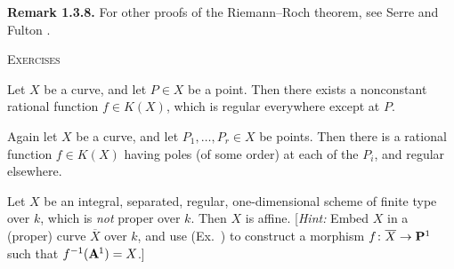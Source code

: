 {\medskip
\noindent\hypertarget{result-IV-1.3.8}{}\textbf{Remark 1.3.8.} For other proofs of the Riemann--Roch theorem, see Serre  and Fulton .

\medskip
\noindent\textsc{Exercises}\par\nobreak\smallskip
{\fontsize{9.2}{10.55}\selectfont\leftskip=21pt\relax
\noindent\hypertarget{ex-IV-1.1}{}Let $X$ be a curve, and let $P\in X$ be a point. Then there exists a nonconstant rational function $f\in K(X)$, which is regular everywhere except at $P$.

\smallskip
\noindent\hypertarget{ex-IV-1.2}{}Again let $X$ be a curve, and let $P_1,\ldots,P_r\in X$ be points. Then there is a rational function $f\in K(X)$ having poles (of some order) at each of the $P_i$, and regular elsewhere.

\smallskip
\noindent\hypertarget{ex-IV-1.3}{}Let $X$ be an integral, separated, regular, one-dimensional scheme of finite type over $k$, which is \emph{not} proper over $k$. Then $X$ is affine. [\emph{Hint:} Embed $X$ in a (proper) curve $\overline X$ over $k$, and use (Ex.~) to construct a morphism $f\colon\overline X\to\mathbf{P}^1$ such that $f^{-1}(\AffSpace{1})=X$.]\par}
}
